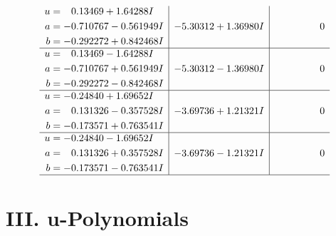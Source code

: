 \documentclass[1p]{elsarticle_modified}
\theoremstyle{definition}
\begin{document}
$$\begin{array}{c|c|c}
\begin{aligned}
u &= \phantom{-}0.13469 + 1.64288 I \\
a &= -0.710767 - 0.561949 I \\
b &= -0.292272 + 0.842468 I\end{aligned}
 & -5.30312 + 1.36980 I & \phantom{-0.000000 } 0 \\ \hline\begin{aligned}
u &= \phantom{-}0.13469 - 1.64288 I \\
a &= -0.710767 + 0.561949 I \\
b &= -0.292272 - 0.842468 I\end{aligned}
 & -5.30312 - 1.36980 I & \phantom{-0.000000 } 0 \\ \hline\begin{aligned}
u &= -0.24840 + 1.69652 I \\
a &= \phantom{-}0.131326 - 0.357528 I \\
b &= -0.173571 + 0.763541 I\end{aligned}
 & -3.69736 + 1.21321 I & \phantom{-0.000000 } 0 \\ \hline\begin{aligned}
u &= -0.24840 - 1.69652 I \\
a &= \phantom{-}0.131326 + 0.357528 I \\
b &= -0.173571 - 0.763541 I\end{aligned}
 & -3.69736 - 1.21321 I & \phantom{-0.000000 } 0\\
 \hline 
 \end{array}$$\newpage
\newpage\renewcommand{\arraystretch}{1}
\centering \section*{ III. u-Polynomials}
\end{document}
